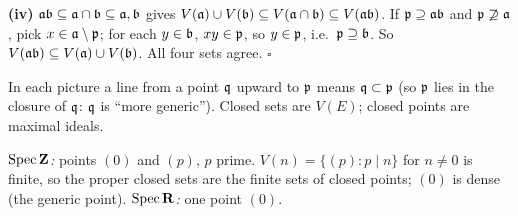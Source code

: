 \documentclass[11pt]{article}
\begin{document}
\textbf{(iv)} $\mathfrak a\mathfrak b\subseteq\mathfrak a\cap\mathfrak b\subseteq\mathfrak a,\mathfrak b$ gives $V(\mathfrak a)\cup V(\mathfrak b)\subseteq V(\mathfrak a\cap\mathfrak b)\subseteq V(\mathfrak a\mathfrak b)$. If $\mathfrak p\supseteq\mathfrak a\mathfrak b$ and $\mathfrak p\not\supseteq\mathfrak a$, pick $x\in\mathfrak a\setminus\mathfrak p$; for each $y\in\mathfrak b$, $xy\in\mathfrak p$, so $y\in\mathfrak p$, i.e.\ $\mathfrak p\supseteq\mathfrak b$. So $V(\mathfrak a\mathfrak b)\subseteq V(\mathfrak a)\cup V(\mathfrak b)$. All four sets agree. \hfill$\square$

\pf
In each picture a line from a point $\mathfrak q$ upward to $\mathfrak p$ means $\mathfrak q\subset\mathfrak p$ (so $\mathfrak p$ lies in the closure of $\mathfrak q$: $\mathfrak q$ is ``more generic''). Closed sets are $V(E)$; closed points are maximal ideals.

\begin{center}
\end{center}

\emph{$\operatorname{Spec}\mathbf Z$:} points $(0)$ and $(p)$, $p$ prime. $V(n)=\{(p):p\mid n\}$ for $n\neq0$ is finite, so the proper closed sets are the finite sets of closed points; $(0)$ is dense (the generic point).
\emph{$\operatorname{Spec}\mathbf R$:} one point $(0)$.
\end{document}
